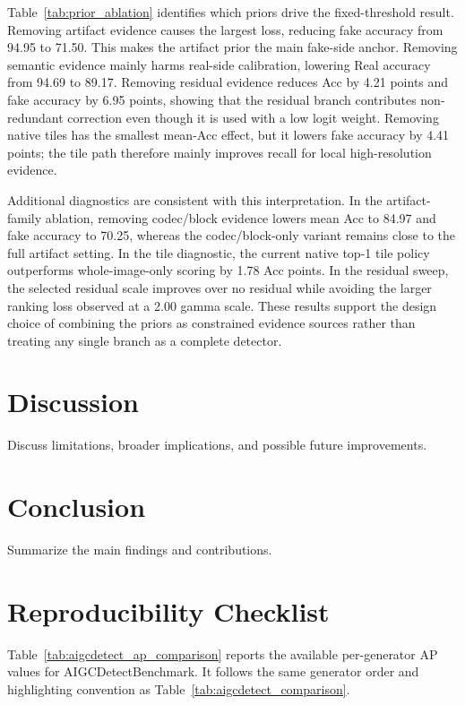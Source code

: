 \documentclass[lettersize,journal]{IEEEtran}
\begin{document}
Table~\ref{tab:prior_ablation} identifies which priors drive the fixed-threshold result. Removing artifact evidence causes the largest loss, reducing fake accuracy from 94.95 to 71.50. This makes the artifact prior the main fake-side anchor. Removing semantic evidence mainly harms real-side calibration, lowering Real accuracy from 94.69 to 89.17. Removing residual evidence reduces Acc by 4.21 points and fake accuracy by 6.95 points, showing that the residual branch contributes non-redundant correction even though it is used with a low logit weight. Removing native tiles has the smallest mean-Acc effect, but it lowers fake accuracy by 4.41 points; the tile path therefore mainly improves recall for local high-resolution evidence.

Additional diagnostics are consistent with this interpretation. In the artifact-family ablation, removing codec/block evidence lowers mean Acc to 84.97 and fake accuracy to 70.25, whereas the codec/block-only variant remains close to the full artifact setting. In the tile diagnostic, the current native top-1 tile policy outperforms whole-image-only scoring by 1.78 Acc points. In the residual sweep, the selected residual scale improves over no residual while avoiding the larger ranking loss observed at a 2.00 gamma scale. These results support the design choice of combining the priors as constrained evidence sources rather than treating any single branch as a complete detector.

\section{Discussion}
\label{sec:discussion}
Discuss limitations, broader implications, and possible future improvements.

\section{Conclusion}
\label{sec:conclusion}
Summarize the main findings and contributions.




\clearpage
\section*{Reproducibility Checklist}

Table~\ref{tab:aigcdetect_ap_comparison} reports the available per-generator AP values for AIGCDetectBenchmark. It follows the same generator order and highlighting convention as Table~\ref{tab:aigcdetect_comparison}.
\end{document}
